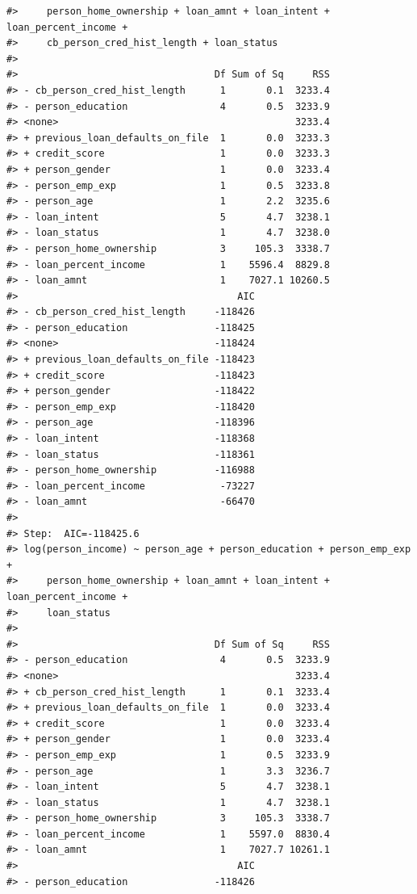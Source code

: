 \documentclass[
  10pt,
]{article}
\begin{document}
\begin{verbatim}
#>     person_home_ownership + loan_amnt + loan_intent + loan_percent_income + 
#>     cb_person_cred_hist_length + loan_status
#> 
#>                                  Df Sum of Sq     RSS
#> - cb_person_cred_hist_length      1       0.1  3233.4
#> - person_education                4       0.5  3233.9
#> <none>                                         3233.4
#> + previous_loan_defaults_on_file  1       0.0  3233.3
#> + credit_score                    1       0.0  3233.3
#> + person_gender                   1       0.0  3233.4
#> - person_emp_exp                  1       0.5  3233.8
#> - person_age                      1       2.2  3235.6
#> - loan_intent                     5       4.7  3238.1
#> - loan_status                     1       4.7  3238.0
#> - person_home_ownership           3     105.3  3338.7
#> - loan_percent_income             1    5596.4  8829.8
#> - loan_amnt                       1    7027.1 10260.5
#>                                      AIC
#> - cb_person_cred_hist_length     -118426
#> - person_education               -118425
#> <none>                           -118424
#> + previous_loan_defaults_on_file -118423
#> + credit_score                   -118423
#> + person_gender                  -118422
#> - person_emp_exp                 -118420
#> - person_age                     -118396
#> - loan_intent                    -118368
#> - loan_status                    -118361
#> - person_home_ownership          -116988
#> - loan_percent_income             -73227
#> - loan_amnt                       -66470
#> 
#> Step:  AIC=-118425.6
#> log(person_income) ~ person_age + person_education + person_emp_exp + 
#>     person_home_ownership + loan_amnt + loan_intent + loan_percent_income + 
#>     loan_status
#> 
#>                                  Df Sum of Sq     RSS
#> - person_education                4       0.5  3233.9
#> <none>                                         3233.4
#> + cb_person_cred_hist_length      1       0.1  3233.4
#> + previous_loan_defaults_on_file  1       0.0  3233.4
#> + credit_score                    1       0.0  3233.4
#> + person_gender                   1       0.0  3233.4
#> - person_emp_exp                  1       0.5  3233.9
#> - person_age                      1       3.3  3236.7
#> - loan_intent                     5       4.7  3238.1
#> - loan_status                     1       4.7  3238.1
#> - person_home_ownership           3     105.3  3338.7
#> - loan_percent_income             1    5597.0  8830.4
#> - loan_amnt                       1    7027.7 10261.1
#>                                      AIC
#> - person_education               -118426

\end{verbatim}
\end{document}
